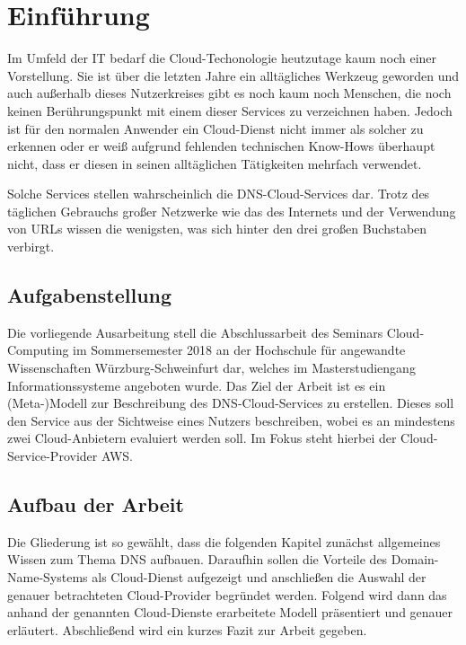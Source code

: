 \section{Einführung}
Im Umfeld der IT bedarf die Cloud-Techonologie heutzutage kaum noch einer Vorstellung. Sie ist über die letzten Jahre ein alltägliches Werkzeug geworden und auch außerhalb dieses Nutzerkreises gibt es noch kaum noch Menschen, die noch keinen Berührungspunkt mit einem dieser Services zu verzeichnen haben. Jedoch ist für den normalen Anwender ein Cloud-Dienst nicht immer als solcher zu erkennen oder er weiß aufgrund fehlenden technischen Know-Hows überhaupt nicht, dass er diesen in seinen alltäglichen Tätigkeiten mehrfach verwendet.

Solche Services stellen wahrscheinlich die DNS-Cloud-Services dar. Trotz des täglichen Gebrauchs großer Netzwerke wie das des Internets und der Verwendung von URLs wissen die wenigsten, was sich hinter den drei großen Buchstaben verbirgt.

\subsection{Aufgabenstellung}
Die vorliegende Ausarbeitung stell die Abschlussarbeit des Seminars Cloud-Computing im Sommersemester 2018 an der Hochschule für angewandte Wissenschaften Würzburg-Schweinfurt dar, welches im Masterstudiengang Informationssysteme angeboten wurde. Das Ziel der Arbeit ist es  ein (Meta-)Modell zur Beschreibung des DNS-Cloud-Services zu erstellen. Dieses soll den Service aus der Sichtweise eines Nutzers beschreiben, wobei es an mindestens zwei Cloud-Anbietern evaluiert werden soll. Im Fokus steht hierbei der Cloud-Service-Provider AWS.

\subsection{Aufbau der Arbeit}
Die Gliederung ist so gewählt, dass die folgenden Kapitel zunächst allgemeines Wissen zum Thema DNS aufbauen. Daraufhin sollen die Vorteile des Domain-Name-Systems als Cloud-Dienst aufgezeigt und anschließen die Auswahl der genauer betrachteten Cloud-Provider begründet werden. Folgend wird dann das anhand der genannten Cloud-Dienste erarbeitete Modell präsentiert und genauer erläutert. Abschließend wird ein kurzes Fazit zur Arbeit gegeben.
